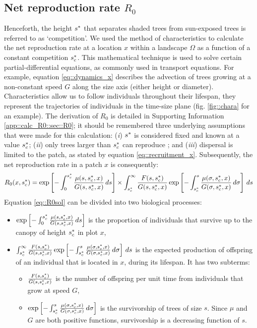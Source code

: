\subsection{Net reproduction rate $ R_0 $}
Henceforth, the height $ {s}^{*} $ that separates shaded trees from sun-exposed trees is referred to as `competition'. We used the method of characteristics to calculate the net reproduction rate at a location $ x $ within a landscape $ \Omega $ as a function of a constant competition $ {s}^{*}_c $. This mathematical technique is used to solve certain partial-differential equations, as commonly used in transport equations. For example, equation \eqref{eq::dynamics_x} describes the advection of trees growing at a non-constant speed $ G $ along the size axis (either height or diameter). Characteristics allow us to follow individuals throughout their lifespan, \ie they represent the trajectories of individuals in the time-size plane (fig. \ref{fig::chara} for an example). The derivation of $ R_0 $ is detailed in Supporting Information \ref{app::calc_R0::sec::R0}; it should be remembered three underlying assumptions that were made for this calculation: (\textit{i}) $ {s}^{*} $ is considered fixed and known at a value $ {s}^{*}_c $; (\textit{ii}) only trees larger than $ {s}^{*}_c $ can reproduce \citep{Strigul2008}; and (\textit{iii}) dispersal is limited to the patch, as stated by equation \eqref{eq::recruitment_x}. Subsequently, the net reproduction rate in a patch $ x $ is consequently:
\begin{equation} \label{eq::R0sol}
	R_0 (x, {s}^{*}_c) = \exp \left[-\int_0^{{s}^{*}_c}\frac{\mu(s, {s}^{*}_c, x)}{G(s, {s}^{*}_c, x)} \, ds \right] \times \int_{{s}^{*}_c}^{\infty} \frac{F(s, {s}^{*}_c)}{G(s, {s}^{*}_c, x)} \exp \left[-\int_{{s}^{*}_c}^{s} \frac{\mu(\sigma, {s}^{*}_c, x)}{G(\sigma, {s}^{*}_c, x)} \, d\sigma \right] \, ds
\end{equation}
Equation \eqref{eq::R0sol} can be divided into two biological processes:
\begin{itemize}
	\item $ \exp\left[-\int_0^{{s}^{*}_c}\frac{\mu(s, {s}^{*}_c, x)}{G(s, {s}^{*}_c, x)} \, ds \right] $ is the proportion of individuals that survive up to the canopy of height $ {s}^{*}_c $ in plot $ x $,
	\item $ \int_{{s}^{*}_c}^{\infty} \frac{F(s, {s}^{*}_c)}{G(s, {s}^{*}_c, x)} \exp \left[-\int_{{s}^{*}_c}^{s} \frac{\mu(\sigma, {s}^{*}_c, x)}{G(\sigma, {s}^{*}_c, x)} \, d\sigma \right] \, ds $ is the expected production of offspring of an individual that is located in $ x $, during its lifespan. It has two subterms:
	\begin{itemize} %
		\item $ \frac{F(s, {s}^{*}_c)}{G(s, {s}^{*}_c, x)} $ is the number of offspring per unit time from individuals that grow at speed $ G $,
		\item $ \exp \left[-\int_{{s}^{*}_c}^{s} \frac{\mu(\sigma, {s}^{*}_c, x)}{G(\sigma, {s}^{*}_c, x)} \, d\sigma \right] $ is the survivorship of trees of size $ s $. Since $ \mu $ and $ G $ are both positive functions, survivorship is a decreasing function of $ s $.
	\end{itemize}
\end{itemize}

